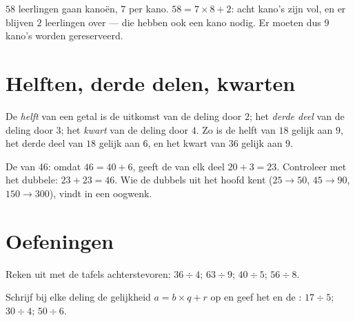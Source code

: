 \begin{example}\label{ex:g3:division:interpret}
$58$ leerlingen gaan kanoën, $7$ per kano. $58 = 7 \times 8 + 2$: acht
kano's zijn vol, en er blijven $2$ leerlingen over --- die hebben ook een
kano nodig. Er moeten dus $9$ kano's worden gereserveerd.
\end{example}

\section{Helften, derde delen, kwarten}

\begin{definition}\label{def:g3:division:half}
De \emph{helft} van een getal is de uitkomst van de deling
door $2$; het \emph{derde deel} van de deling door $3$; het
\emph{kwart} van de deling door $4$. Zo is de helft van
$18$ gelijk aan $9$, het derde deel van $18$ gelijk aan $6$, en het kwart
van $36$ gelijk aan $9$.
\end{definition}

\begin{example}\label{ex:g3:division:double}
De  van $46$: omdat $46 = 40 + 6$, geeft de  van elk deel
$20 + 3 = 23$. Controleer met het dubbele: $23 + 23 = 46$. Wie de dubbels
uit het hoofd kent ($25 \to 50$, $45 \to 90$, $150 \to 300$), vindt
 in een oogwenk.
\end{example}

\section{Oefeningen}

\begin{exercise}[$\star$]\label{exo:g3:division:1}
Reken uit met de tafels achterstevoren: $36 \div 4$; \quad $63 \div 9$;
\quad $40 \div 5$; \quad $56 \div 8$.
\end{exercise}

\begin{exercise}[$\star$]\label{exo:g3:division:2}
Schrijf bij elke deling de gelijkheid $a = b \times q + r$ op en geef het
 en de : $17 \div 5$; \quad $30 \div 4$; \quad
$50 \div 6$.
\end{exercise}

